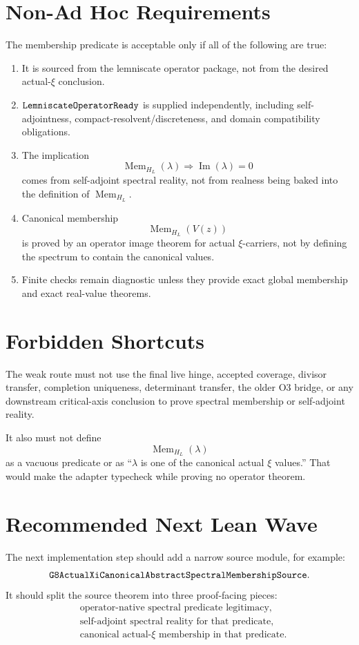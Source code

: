 \documentclass[11pt]{article}
\newcommand{\im}{\operatorname{Im}}
\newcommand{\Mem}{\operatorname{Mem}}
\begin{document}
\section*{Non-Ad Hoc Requirements}

The membership predicate is acceptable only if all of the following are true:
\begin{enumerate}
\item It is sourced from the lemniscate operator package, not from the desired
  actual-\(\xi\) conclusion.
\item \(\verb|LemniscateOperatorReady|\) is supplied independently, including
  self-adjointness, compact-resolvent/discreteness, and domain compatibility
  obligations.
\item The implication
  \[
    \Mem_{H_L}(\lambda)\Rightarrow \im(\lambda)=0
  \]
  comes from self-adjoint spectral reality, not from realness being baked into
  the definition of \(\Mem_{H_L}\).
\item Canonical membership
  \[
    \Mem_{H_L}(V(z))
  \]
  is proved by an operator image theorem for actual \(\xi\)-carriers, not by
  defining the spectrum to contain the canonical values.
\item Finite checks remain diagnostic unless they provide exact global
  membership and exact real-value theorems.
\end{enumerate}

\section*{Forbidden Shortcuts}

The weak route must not use the final live hinge, accepted coverage, divisor
transfer, completion uniqueness, determinant transfer, the older O3 bridge, or
any downstream critical-axis conclusion to prove spectral membership or
self-adjoint reality.

It also must not define
\[
  \Mem_{H_L}(\lambda)
\]
as a vacuous predicate or as ``\(\lambda\) is one of the canonical actual
\(\xi\) values.''  That would make the adapter typecheck while proving no
operator theorem.

\section*{Recommended Next Lean Wave}

The next implementation step should add a narrow source module, for example:
\[
  \verb|G8ActualXiCanonicalAbstractSpectralMembershipSource|.
\]
It should split the source theorem into three proof-facing pieces:
\[
\begin{aligned}
&\text{operator-native spectral predicate legitimacy},\\
&\text{self-adjoint spectral reality for that predicate},\\
&\text{canonical actual-\(\xi\) membership in that predicate}.
\end{aligned}
\]
\end{document}
